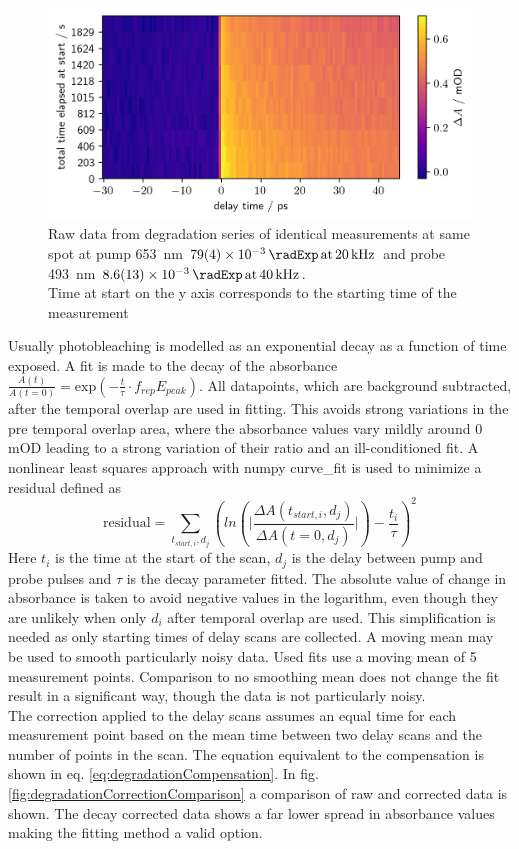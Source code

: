 \documentclass[twoside,openright]{scrreprt}
\def\pumpExp#1{\ensuremath{\SI{#1}{\radExp}\,\mathrm{at}\, \SI{20}{\kilo\hertz}}}
\def\probeExp#1{\ensuremath{\SI{#1}{\radExp}\,\mathrm{at}\, \SI{40}{\kilo\hertz}}}
\begin{document}
\begin{figure}[hbtp]
\centering
\includegraphics[width=\linewidth]{images/DegradationRAWPump653Probe493.png}
\caption{Raw data from degradation series of identical measurements at same spot at pump \SI{653}{\nano\meter} \pumpExp{79(4)e-3} and probe \SI{493}{\nano\meter} \probeExp{8.6(1.3)e-3}.\\
Time at start on the y axis corresponds to the starting time of the measurement\label{fig:rawDegradation}}
\end{figure}
Usually photobleaching is modelled as an exponential decay as a function of time exposed. A fit is made to the decay of the absorbance $\frac{A\left(t\right)}{A\left(t=0\right)} = \mathrm{exp}\left(-\frac{t}{\tau}\cdot f_{rep}E_{peak}\right)$.
All datapoints, which are background subtracted, after the temporal overlap are used in fitting. This avoids strong variations in the pre temporal overlap area, where the absorbance values vary mildly around 0 mOD leading to a strong variation of their ratio and an ill-conditioned fit. A nonlinear least squares approach with numpy curve\_fit is used to minimize a residual defined as
\begin{equation}\label{eq:degradationFitting}
\mathrm{residual} = \sum_{t_{start,i},d_j} \left(ln\left(\lvert\frac{\Delta A(t_{start,i},d_j)}{\Delta A(t=0,d_j)}\rvert\right)- \frac{t_i}{\tau}\right)^2
\end{equation}
Here $t_i$ is the time at the start of the scan, $d_j$ is the delay between pump and probe pulses and $\tau$ is the decay parameter fitted. The absolute value of change in absorbance is taken to avoid negative values in the logarithm, even though they are unlikely when only $d_i$ after temporal overlap are used.  This simplification is needed as only starting times of delay scans are collected. A moving mean may be used to smooth particularly noisy data. Used fits use a moving mean of 5 measurement points. Comparison to no smoothing mean does not change the fit result in a significant way, though the data is not particularly noisy.\\
The correction applied to the delay scans assumes an equal time for each measurement point based on the mean time between two delay scans and the number of points in the scan. The equation equivalent to the compensation is shown in eq. \ref{eq:degradationCompensation}. In fig. \ref{fig:degradationCorrectionComparison} a comparison of raw and corrected data is shown. The decay corrected data shows a far lower spread in absorbance values making the fitting method a valid option. 
\end{document}
